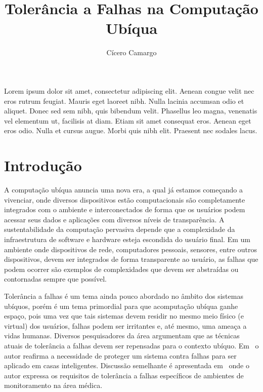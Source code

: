 \documentclass{SBCbookchapter}
\title{Tolerância a Falhas na Computação Ubíqua}
\author{Cícero Camargo}
\begin{document}
\maketitle


\begin{resumo}


Lorem ipsum dolor sit amet, consectetur adipiscing elit. Aenean congue velit nec eros rutrum feugiat. Mauris eget laoreet nibh. Nulla lacinia accumsan odio et aliquet. Donec sed sem nibh, quis bibendum velit. Phasellus leo magna, venenatis vel elementum ut, facilisis at diam. Etiam sit amet consequat eros. Aenean eget eros odio. Nulla et cursus augue. Morbi quis nibh elit. Praesent nec sodales lacus.
	

\end{resumo}

\section{Introdução} %

A computação ubíqua anuncia uma nova era, a qual já estamos começando a vivenciar, onde diversos dispositivos estão computacionais são completamente integrados com o ambiente e interconectados de forma que os usuários podem acessar seus dados e aplicações com diversos níveis de transparência. A sustentabilidade da computação pervasiva depende que a complexidade da infraestrutura de software e hardware esteja escondida do usuário final. Em um ambiente onde dispositivos de rede, computadores pessoais, sensores, entre outros dispositivos, devem ser integrados de forma transparente ao usuário, as falhas que podem ocorrer são exemplos de complexidades que devem ser abstraídas ou contornadas sempre que possível.

Tolerância a falhas é um tema ainda pouco abordado no âmbito dos sistemas ubíquos, porém é um tema primordial para que acomputação ubíqua ganhe espaço, pois uma vez que tais sistemas devem residir no mesmo meio físico (e virtual) dos usuários, falhas podem ser irritantes e, até mesmo, uma ameaça a vidas humanas. Diversos pesquisadores da área argumentam que as técnicas atuais de tolerância a falhas devem ser repensadas para o contexto ubíquo. Em~\cite{Banavar2000} o autor reafirma a necessidade de proteger um sistema contra falhas para ser aplicado em casas inteligentes. Discussão semelhante é apresentada em~\cite{Bohn02} onde o autor expressa os requisitos de tolerância a falhas específicos de ambientes de monitoramento na área médica. %
\end{document}
